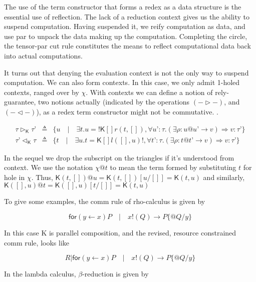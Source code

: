 \documentclass{llncs}
\renewcommand{\:}{\colon}
\begin{document}
The use of the term constructor that forms a redex as a data structure
is the essential use of reflection. The lack of a reduction context
gives us the ability to suspend computation. Having suspended it, we
reify computation as data, and use par to unpack the data making up
the computation. Completing the circle, the tensor-par cut rule
constitutes the means to reflect computational data back into actual
computations.

It turns out that denying the evaluation context is not the only way
to suspend computation. We can also form contexts. In this case, we
only admit 1-holed contexts, ranged over by $\chi$. With contexts we can
define a notion of rely-guarantee, two notions actually (indicated by
the operations $(- \rhd -)$, and $(- \lhd -)$), as a redex term constructor
might not be commutative. .

\begin{eqnarray*}
\tau \rhd_{\mathsf{K}} \tau’ & \triangleq & \{ u \quad | \quad \exists t. u = \mathsf{!}\mathsf{K}[]r(t, []),\forall u’ : \tau. (\exists \rho : u@u’ \rightarrow v) \Rightarrow v:\tau’ \} \\
\tau’ \lhd_{\mathsf{K}} \tau & \triangleq & \{ t \quad | \quad \exists u. t = \mathsf{K}[]l([], u)\mathsf{!},\forall t’ : \tau. (\exists \rho: t@t’ \rightarrow v) \Rightarrow v : \tau’ \}
\end{eqnarray*}

In the sequel we drop the subscript on the triangles if it’s understood from
context. We use the notation $\chi @ t$ to mean the term formed by
substituting $t$ for hole in $\chi$. Thus, $\mathsf{K}(t, [])@u = \mathsf{K}(t, [])[u/[]] = \mathsf{K}(t,u)$ and similarly, $\mathsf{K}([], u)@t = \mathsf{K}([], u)[t/[]] = \mathsf{K}(t,u)$

To give some examples, the comm rule of rho-calculus is given by

\begin{equation*}
  \mathsf{for}( y \leftarrow x )P \quad | \quad x\mathsf{!}(Q) \rightarrow P\{ @Q/y \}
\end{equation*}

In this case K is parallel composition, and the revised, resource
constrained comm rule, looks like

\begin{equation*}
  R | \mathsf{for}( y \leftarrow x )P \quad | \quad x\mathsf{!}(Q) \rightarrow P\{ @Q/y \}
\end{equation*}

In the lambda calculus, $\beta$-reduction is given by
\end{document}
